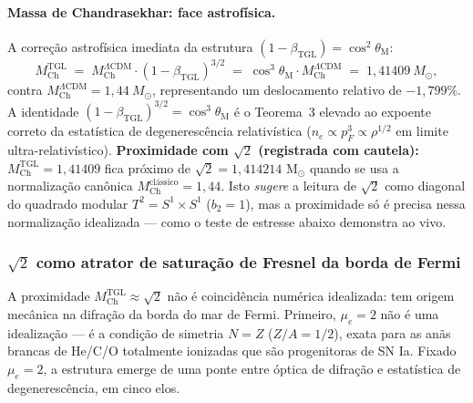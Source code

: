 \documentclass[12pt,a4paper]{article}
\newcommand{\betatgl}{\beta_{\text{TGL}}}
\newcommand{\thetaM}{\theta_{\text{M}}}
\begin{document}
\paragraph{Massa de Chandrasekhar: face astrofísica.}
A correção astrofísica imediata da estrutura $(1-\betatgl) = \cos^{2}\thetaM$:
\begin{equation}
M_{\text{Ch}}^{\text{TGL}} \;=\; M_{\text{Ch}}^{\Lambda\text{CDM}} \cdot
(1 - \betatgl)^{3/2} \;=\; \cos^{3}\thetaM \cdot M_{\text{Ch}}^{\Lambda\text{CDM}}
\;=\; 1{,}41409~M_{\odot},
\label{eq:chandrasekhar}
\end{equation}
contra $M_{\text{Ch}}^{\Lambda\text{CDM}} = 1{,}44~M_{\odot}$,
representando um deslocamento relativo de $-1{,}799\%$.
A identidade $(1-\betatgl)^{3/2} = \cos^{3}\thetaM$ é o Teorema~3 elevado
ao expoente correto da estatística de degenerescência relativística
($n_{e} \propto p_{F}^{3} \propto \rho^{1/2}$ em limite ultra-relativístico).
\textbf{Proximidade com $\sqrt{2}$ (registrada com cautela):}
$M_{\text{Ch}}^{\text{TGL}} = 1{,}41409$ fica próximo de
$\sqrt{2} = 1{,}414214$ M$_{\odot}$ quando se usa a normalização canônica
$M_{\text{Ch}}^{\text{clássico}} = 1{,}44$.  Isto \emph{sugere} a leitura de
$\sqrt{2}$ como diagonal do quadrado modular $T^2 = S^1\times S^1$ ($b_2 = 1$),
mas a proximidade só é precisa nessa normalização idealizada --- como o teste de
estresse abaixo demonstra ao vivo.

\subsubsection{$\sqrt{2}$ como atrator de saturação de Fresnel da borda de Fermi}
\label{sec:sqrt2-stress}

A proximidade $M_{\text{Ch}}^{\text{TGL}} \approx \sqrt{2}$ não é coincidência
numérica idealizada: tem origem mecânica na difração da borda do mar de Fermi.
Primeiro, $\mu_e = 2$ não é uma idealização --- é a condição de simetria $N = Z$
($Z/A = 1/2$), exata para as anãs brancas de He/C/O totalmente ionizadas que são
progenitoras de SN Ia.  Fixado $\mu_e = 2$, a estrutura emerge de uma ponte entre
óptica de difração e estatística de degenerescência, em cinco elos.
\end{document}
